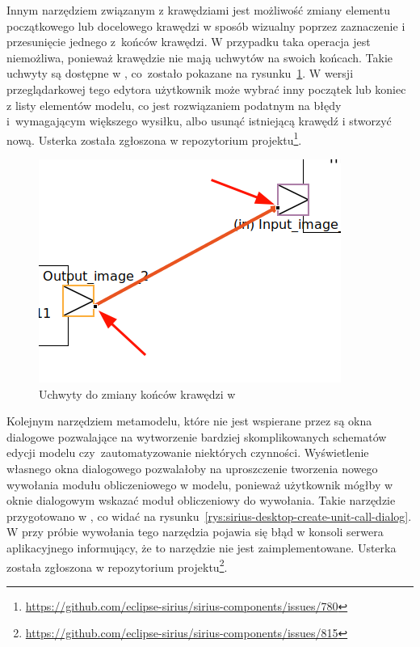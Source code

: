Innym narzędziem związanym z krawędziami jest możliwość zmiany elementu
początkowego lub docelowego krawędzi w sposób wizualny poprzez zaznaczenie i
przesunięcie jednego z~końców krawędzi. W przypadku \SiriusWeb{} taka
operacja jest niemożliwa, ponieważ krawędzie nie mają uchwytów na swoich
końcach. Takie uchwyty są dostępne w \SiriusDesktop{}, co~zostało pokazane
na rysunku~\ref{rys:sirius-desktop-reconnect-edge}. W wersji
przeglądarkowej tego edytora użytkownik może wybrać inny początek lub koniec
z listy elementów modelu, co jest rozwiązaniem podatnym na błędy i~wymagającym
większego wysiłku, albo usunąć istniejącą krawędź i stworzyć nową.
Usterka została zgłoszona w repozytorium projektu\footnote{
	\url{https://github.com/eclipse-sirius/sirius-components/issues/780}
}.

\begin{figure}[!hb]
  \centering

  \includegraphics[width=0.5\linewidth]{./images/sirius-desktop-reconnect-edge.png}
  \caption{Uchwyty do zmiany końców krawędzi w \SiriusDesktop{}}\label{rys:sirius-desktop-reconnect-edge}
\end{figure}

Kolejnym narzędziem metamodelu, które nie jest wspierane przez \SiriusWeb{} są
okna dialogowe pozwalające na wytworzenie bardziej
skomplikowanych
schematów edycji modelu czy~zautomatyzowanie niektórych czynności. Wyświetlenie
własnego okna dialogowego pozwalałoby na uproszczenie tworzenia nowego
wywołania modułu obliczeniowego w modelu, ponieważ użytkownik mógłby w oknie
dialogowym wskazać moduł obliczeniowy do wywołania. Takie narzędzie
przygotowano w \SiriusDesktop{}, co widać na
rysunku~\ref{rys:sirius-desktop-create-unit-call-dialog}. W \SiriusWeb{} przy
próbie wywołania tego narzędzia pojawia się błąd w konsoli
serwera
aplikacyjnego informujący, że to narzędzie nie jest zaimplementowane. Usterka
została zgłoszona w repozytorium projektu\footnote{
	\url{https://github.com/eclipse-sirius/sirius-components/issues/815}
}.

